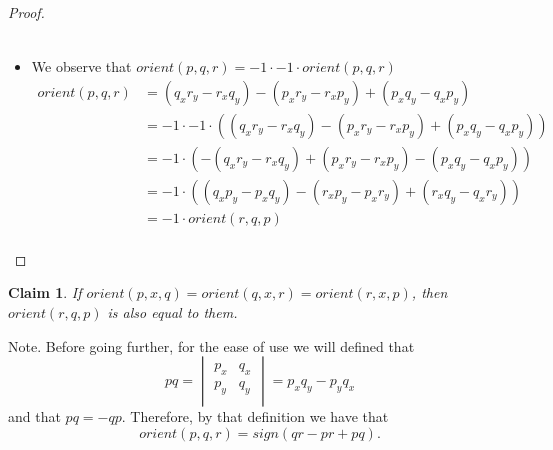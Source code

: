 \documentclass{article}
\newtheorem{claim}[theorem]{Claim}
\begin{document}
\begin{proof}
\begin{itemize}
\begin{equation*}
\begin{split}
            \end{split}
        \end{equation*}
    \item We observe that $orient(p, q, r) = -1 \cdot -1 \cdot orient(p, q, r)$ 
        \begin{equation*} 
            \begin{split}
                orient(p, q, r) & = (q_xr_y - r_xq_y) - (p_xr_y-r_xp_y) + (p_xq_y - q_xp_y) \\
                                & = -1 \cdot -1 \cdot ((q_xr_y - r_xq_y) - (p_xr_y-r_xp_y) + (p_xq_y - q_xp_y))\\
                                & = -1 \cdot (-(q_xr_y - r_xq_y) + (p_xr_y-r_xp_y) - (p_xq_y - q_xp_y))\\
                                & = -1 \cdot ((q_xp_y - p_xq_y) -(r_xp_y - p_xr_y) + (r_xq_y - q_xr_y)) \\
                                & = -1 \cdot orient(r, q, p) \\
            \end{split}
        \end{equation*}
    \end{itemize}
\end{proof}

\begin{claim}
    If $orient(p,x,q) = orient(q, x, r) = orient(r, x, p)$, then $orient(r, q, p)$
    is also equal to them. 
\end{claim}

\noindent Note. Before going further, for the ease of use we will defined that
\begin{equation*}
    pq = 
    \begin{vmatrix}
        p_x & q_x \\
        p_y & q_y \\
    \end{vmatrix} = p_xq_y - p_yq_x
\end{equation*}
and that $pq = -qp$. Therefore, by that definition we have that 
$$ orient(p, q, r) = sign(qr - pr + pq).$$ 
\end{document}
